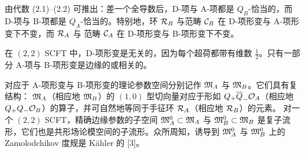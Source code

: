 由代数 (2.1)--(2.2) 可推出：差一个全导数后，D-项与 A-项都是 $Q_B$-恰当的，而 D-项与 B-项都是
$Q_A$-恰当的。特别地，环 $\mathcal{R}_B$ 与范畴 $\mathcal{C}_B$ 在 D-项形变与 A-项形变下不变，而 $\mathcal{R}_A$ 与
范畴 $\mathcal{C}_A$ 在 D-项形变与 B-项形变下不变。

在 $(2,2)$ SCFT 中，D-项形变是无关的，因为每个超荷都带有维数 $\frac12$。只有一部分 A-项与
B-项形变是边缘的或相关的。

对应于 A-项形变与 B-项形变的理论参数空间分别记作 $\mathfrak{M}_A$ 与 $\mathfrak{M}_B$。它们具有复结构：
$\mathfrak{M}_A$（相应地 $\mathfrak{M}_B$）的 $(1,0)$ 型切向量对应于形如 $Q_+\overline Q_-\mathcal{O}_A$（相应地
$Q_+Q_-\mathcal{O}_B$）的算子，并可自然地等同于手征环 $\mathcal{R}_A$（相应地 $\mathcal{R}_B$）的元素。
对一个 $(2,2)$ SCFT，精确边缘参数的子空间 $\mathfrak{M}_A^0\subset\mathfrak{M}_A$ 与 $\mathfrak{M}_B^0\subset\mathfrak{M}_B$
是复子流形，它们也是共形场论模空间的子流形。众所周知，诱导到 $\mathfrak{M}_A^0$ 与 $\mathfrak{M}_B^0$ 上的
Zamolodchikov 度规是 Kähler 的 [3]。

